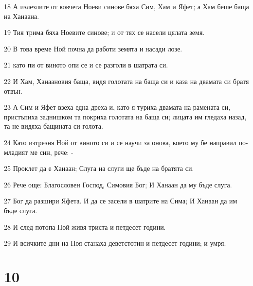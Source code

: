 \par 18 А излезлите от ковчега Ноеви синове бяха Сим, Хам и Яфет; а Хам беше баща на Ханаана.
\par 19 Тия трима бяха Ноевите синове; и от тях се насели цялата земя.
\par 20 В това време Ной почна да работи земята и насади лозе.
\par 21 като пи от виното опи се и се разголи в шатрата си.
\par 22 И Хам, Ханаановия баща, видя голотата на баща си и каза на двамата си братя отвън.
\par 23 А Сим и Яфет взеха една дреха и, като я туриха двамата на рамената си, пристъпиха заднишком та покриха голотата на баща си; лицата им гледаха назад, та не видяха бащината си голота.
\par 24 Като изтрезня Ной от виното си и се научи за онова, което му бе направил по-младият ме син, рече: -
\par 25 Проклет да е Ханаан; Слуга на слуги ще бъде на братята си.
\par 26 Рече още: Благословен Господ, Симовия Бог; И Ханаан да му бъде слуга.
\par 27 Бог да разшири Яфета. И да се засели в шатрите на Сима; И Ханаан да им бъде слуга.
\par 28 И след потопа Ной живя триста и петдесет години.
\par 29 И всичките дни на Ноя станаха деветстотин и петдесет години; и умря.

\chapter{10}


